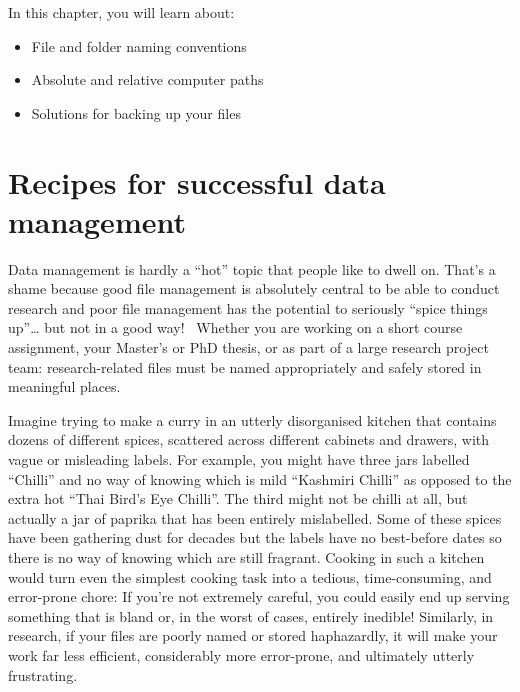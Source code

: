 \documentclass[
  letterpaper,
  DIV=11,
  numbers=noendperiod]{scrreprt}
\providecommand{\tightlist}{%
  \setlength{\itemsep}{0pt}\setlength{\parskip}{0pt}}
\begin{document}
In this chapter, you will learn about:

\begin{itemize}
\tightlist
\item
  File and folder naming conventions
\item
  Absolute and relative computer paths
\item
  Solutions for backing up your files
\end{itemize}

\section{Recipes for successful data
management}\label{recipes-for-successful-data-management}

Data management is hardly a ``hot'' topic that people like to dwell on.
That's a shame because good file management is absolutely central to be
able to conduct research and poor file management has the potential to
seriously ``spice things up''\ldots{} but not in a good
way!~️ Whether you are working on a short course
assignment, your Master's or PhD thesis, or as part of a large research
project team: research-related files must be named appropriately and
safely stored in meaningful places.

Imagine trying to make a curry in an utterly disorganised kitchen that
contains dozens of different spices, scattered across different cabinets
and drawers, with vague or misleading labels. For example, you might
have three jars labelled ``Chilli'' and no way of knowing which is mild
``Kashmiri Chilli'' as opposed to the extra hot ``Thai Bird's Eye
Chilli''. The third might not be chilli at all, but actually a jar of
paprika that has been entirely mislabelled. Some of these spices have
been gathering dust for decades but the labels have no best-before dates
so there is no way of knowing which are still fragrant. Cooking in such
a kitchen would turn even the simplest cooking task into a tedious,
time-consuming, and error-prone chore: If you're not extremely careful,
you could easily end up serving something that is bland or, in the worst
of cases, entirely inedible! Similarly, in research, if your files are
poorly named or stored haphazardly, it will make your work far less
efficient, considerably more error-prone, and ultimately utterly
frustrating.
\end{document}
